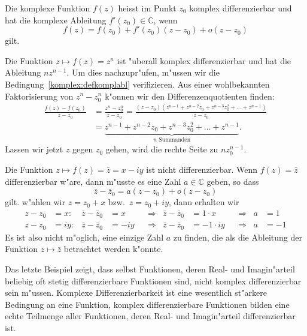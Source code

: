 \begin{definition}
Die komplexe Funktion $f(z)$ heisst im Punkt $z_0$ komplex differenzierbar
und hat die komplexe Ableitung $f'(z_0)\in\mathbb C$, wenn 
%
%
%
\begin{equation}
f(z)=f(z_0) + f'(z_0)(z-z_0) +o(z-z_0)
\label{komplex:defkomplabl}
\end{equation}
gilt.
\end{definition}

\begin{beispiel}
Die Funktion $z\mapsto f(z)=z^n$ ist "uberall komplex differenzierbar
und hat die Ableitung $nz^{n-1}$.
Um dies nachzupr"ufen, m"ussen wir die Bedingung~\eqref{komplex:defkomplabl}
verifizieren.
Aus einer wohlbekannten Faktorisierung von $z^n - z_0^n$ k"onnen wir den
Differenzenquotienten finden:
\begin{align*}
\frac{f(z)-f(z_0)}{z-z_0}
&=
\frac{z^n-z_0^n}{z-z_0}
=
\frac{(z-z_0)(z^{n-1}+z^{n-2}z_0+z^{n-3}z_0^2+\dots+z^{n-1})}{z-z_0}
\\
&=
\underbrace{z^{n-1}+z^{n-2}z_0+z^{n-3}z_0^2+\dots+z^{n-1}
}_{\displaystyle \text{$n$ Summanden}}.
\end{align*}
Lassen wir jetzt $z$ gegen $z_0$ gehen, wird die rechte Seite
zu $nz_0^{n-1}$.
\end{beispiel}

\begin{beispiel}
Die Funktion $z\mapsto f(z)=\bar z=x-iy$ ist nicht differenzierbar.
Wenn $f(z)=\bar z$ differenzierbar w"are, dann m"usste es eine Zahl
$a\in\mathbb C$ geben, so dass 
\[
\bar z-\bar z_0=a(z-z_0)+o(z-z_0)
\]
gilt.
w"ahlen wir $z=z_0+x$ bzw.~$z=z_0+iy$, dann erhalten wir
\[
\begin{aligned}
z-z_0&=x:&
\bar z-\bar z_0&=x
&&\Rightarrow&
\bar z-\bar z_0&=1\cdot x
&&\Rightarrow&
a&=1
\\
z-z_0&=iy:&
\bar z-\bar z_0&=-iy
&&\Rightarrow&
\bar z-\bar z_0&=-1\cdot iy
&&\Rightarrow&
a&=-1
\end{aligned}
\]
Es ist also nicht m"oglich, eine einzige Zahl $a$ zu finden, die als
die Ableitung der Funktion $z\mapsto \bar z$ betrachtet werden k"onnte.
\end{beispiel}

Das letzte Beispiel zeigt, dass
selbst Funktionen, deren Real- und Imagin"arteil beliebig oft stetig
differenzierbare Funktionen sind, nicht komplex differenzierbar
sein m"ussen.
Komplexe Differenzierbarkeit ist eine wesentlich st"arkere Bedingung
an eine Funktion, komplex differenzierbare Funktionen bilden eine
echte Teilmenge aller Funktionen, deren Real- und Imagin"arteil
differenzierbar ist.


